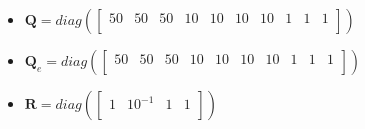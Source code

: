 \documentclass{thesisreport}
\begin{document}
\begin{itemize}
	\item $\bm{Q} = diag(
	\begin{bmatrix}
			50 & 50 & 50 & 10 & 10 & 10 & 10 & 1 & 1 & 1\\
	\end{bmatrix})$
	
	\item $\bm{Q}_e = diag(
	\begin{bmatrix}
			50 & 50 & 50 & 10 & 10 & 10 & 10 & 1 & 1 & 1\\
	\end{bmatrix})$
	
	\item $\bm{R} =diag(
	\begin{bmatrix}
			1 & 10^{-1} & 1 & 1\\
	\end{bmatrix}) $
\end{itemize}
\end{document}
